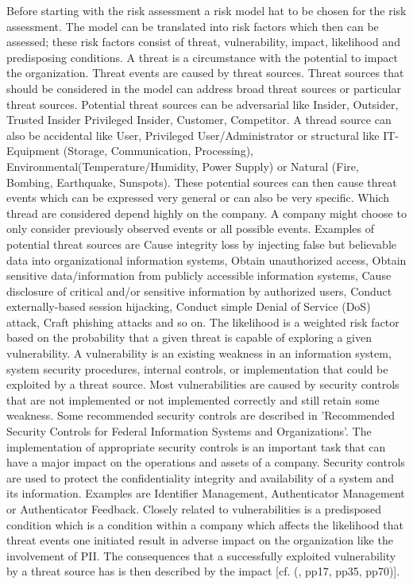 Before starting with the risk assessment a risk model hat to be chosen for the risk assessment. The model can be translated into risk factors which then can be assessed; these risk factors consist of threat, vulnerability, impact, likelihood and predisposing conditions.  A threat is a circumstance with the potential to impact the organization. Threat events are caused by threat sources. Threat sources that should be considered in the model can address broad threat sources or particular threat sources. Potential threat sources can be adversarial like Insider, Outsider, Trusted Insider Privileged Insider, Customer, Competitor. A thread source can also be accidental like User, Privileged User/Administrator or structural like IT-Equipment (Storage, Communication, Processing), Environmental(Temperature/Humidity, Power Supply) or Natural (Fire, Bombing, Earthquake, Sunspots). These potential sources can then cause threat events which can be expressed very general or can also be very specific. Which thread are considered depend highly on the company. A company might choose to only consider previously observed events or all possible events. Examples of potential threat sources are Cause integrity loss by injecting false but believable data into organizational information systems, Obtain unauthorized access, Obtain sensitive data/information from publicly accessible information systems, Cause disclosure of critical and/or sensitive information by authorized users, Conduct externally-based session hijacking, Conduct simple Denial of Service (DoS) attack, Craft phishing attacks and so on. The likelihood is a weighted risk factor based on the probability that a given threat is capable of exploring a given vulnerability. A vulnerability is an existing weakness in an information system, system security procedures, internal controls, or implementation that could be exploited by a threat source. Most vulnerabilities are caused by security controls that are not implemented or not implemented correctly and still retain some weakness. Some recommended security controls are described in 'Recommended Security Controls for Federal Information Systems and Organizations'. The implementation of appropriate security controls is an important task that can have a major impact on the operations and assets of a company. Security controls are used to protect the confidentiality integrity and availability of a system and its information. Examples are Identifier Management, Authenticator Management or Authenticator Feedback. Closely related to vulnerabilities is a predisposed condition which is a condition within a company which affects the likelihood that threat events one initiated result in adverse impact on the organization like the involvement of PII. The consequences that a successfully exploited vulnerability by a threat source has is then described by the impact  [cf. (\cite{NIST:2012:GCRA}, pp17, pp35, pp70)].

